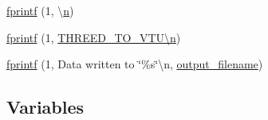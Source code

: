 \begin{DoxyCompactItemize}
\hyperlink{a00614_a8e4a0930102fdc798344d4c081733707}{fprintf} (1, \textquotesingle{}\textbackslash{}\hyperlink{a00623_a781a04ab095280f838ff3eb0e51312e0}{n}\textquotesingle{})
\item 
\hyperlink{a00614_aa86c8279782c3aa4a79a29c9e84d84cd}{fprintf} (1, \textquotesingle{}\hyperlink{a00623_a781a04ab095280f838ff3eb0e51312e0}{T\+H\+R\+E\+E\+D\+\_\+\+T\+O\+\_\+\+V\+T\+U\textbackslash{}n}\textquotesingle{})
\item 
\hyperlink{a00614_a133635719affbdef46ee70cd6d8d19de}{fprintf} (1, \textquotesingle{} Data written to \char`\"{}\%s\char`\"{}\textbackslash{}n\textquotesingle{}, \hyperlink{a00617_a5934d690c688edbd92210f38fe5855e7}{output\+\_\+filename})
\end{DoxyCompactItemize}
\subsection*{Variables}
